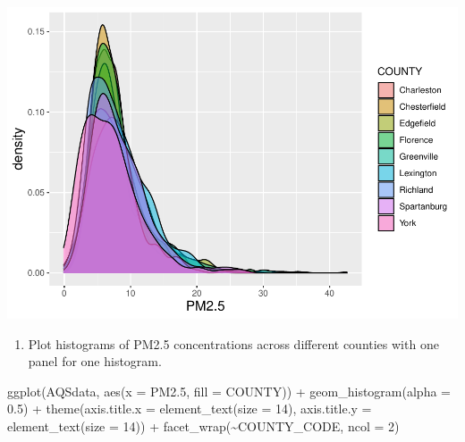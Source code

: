 \documentclass[
]{article}
\newenvironment{Shaded}{\begin{snugshade}}{\end{snugshade}}
\newcommand{\AttributeTok}[1]{\textcolor[rgb]{0.77,0.63,0.00}{#1}}
\newcommand{\DecValTok}[1]{\textcolor[rgb]{0.00,0.00,0.81}{#1}}
\newcommand{\FloatTok}[1]{\textcolor[rgb]{0.00,0.00,0.81}{#1}}
\newcommand{\FunctionTok}[1]{\textcolor[rgb]{0.00,0.00,0.00}{#1}}
\newcommand{\NormalTok}[1]{#1}
\newcommand{\SpecialCharTok}[1]{\textcolor[rgb]{0.00,0.00,0.00}{#1}}
\providecommand{\tightlist}{%
  \setlength{\itemsep}{0pt}\setlength{\parskip}{0pt}}
\begin{document}
\includegraphics{HW1-Trinath-Sai-Subhash-Reddy-Pittala_files/figure-latex/unnamed-chunk-19-1.pdf}

\begin{enumerate}
\def\labelenumi{\alph{enumi}.}
\setcounter{enumi}{2}
\tightlist
\item
  Plot histograms of PM2.5 concentrations across different counties with
  one panel for one histogram.
\end{enumerate}

\begin{Shaded}
\begin{Highlighting}[]
\FunctionTok{ggplot}\NormalTok{(AQSdata, }\FunctionTok{aes}\NormalTok{(}\AttributeTok{x =}\NormalTok{ PM2}\FloatTok{.5}\NormalTok{, }\AttributeTok{fill =}\NormalTok{ COUNTY)) }\SpecialCharTok{+} \FunctionTok{geom\_histogram}\NormalTok{(}\AttributeTok{alpha =} \FloatTok{0.5}\NormalTok{) }\SpecialCharTok{+}
    \FunctionTok{theme}\NormalTok{(}\AttributeTok{axis.title.x =} \FunctionTok{element\_text}\NormalTok{(}\AttributeTok{size =} \DecValTok{14}\NormalTok{), }\AttributeTok{axis.title.y =} \FunctionTok{element\_text}\NormalTok{(}\AttributeTok{size =} \DecValTok{14}\NormalTok{)) }\SpecialCharTok{+}
    \FunctionTok{facet\_wrap}\NormalTok{(}\SpecialCharTok{\textasciitilde{}}\NormalTok{COUNTY\_CODE, }\AttributeTok{ncol =} \DecValTok{2}\NormalTok{)}
\end{Highlighting}
\end{Shaded}
\end{document}
